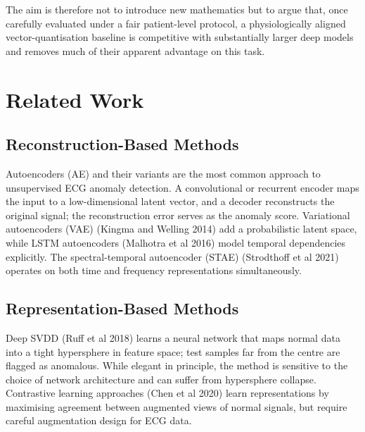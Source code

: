 \documentclass{iopjournal}
\begin{document}
The aim is therefore not to introduce new mathematics but to argue that, once carefully evaluated under a fair patient-level protocol, a physiologically aligned vector-quantisation baseline is competitive with substantially larger deep models and removes much of their apparent advantage on this task.

\section{Related Work}

\subsection{Reconstruction-Based Methods}

Autoencoders (AE) and their variants are the most common approach to unsupervised ECG anomaly detection. A convolutional or recurrent encoder maps the input to a low-dimensional latent vector, and a decoder reconstructs the original signal; the reconstruction error serves as the anomaly score. Variational autoencoders (VAE) (Kingma and Welling 2014) add a probabilistic latent space, while LSTM autoencoders (Malhotra et al 2016) model temporal dependencies explicitly. The spectral-temporal autoencoder (STAE) (Strodthoff et al 2021) operates on both time and frequency representations simultaneously. 


\subsection{Representation-Based Methods}

Deep SVDD (Ruff et al 2018) learns a neural network that maps normal data into a tight hypersphere in feature space; test samples far from the centre are flagged as anomalous. While elegant in principle, the method is sensitive to the choice of network architecture and can suffer from hypersphere collapse. Contrastive learning approaches (Chen et al 2020) learn representations by maximising agreement between augmented views of normal signals, but require careful augmentation design for ECG data. 
\end{document}
